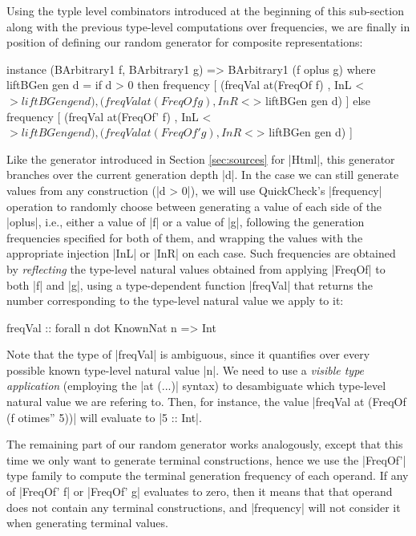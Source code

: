 Using the typle level combinators introduced at the beginning of this
sub-section along with the previous type-level computations over frequencies, we
are finally in position of defining our random generator for composite
representations:

\begin{code}
instance (BArbitrary1 f, BArbitrary1 g)
  => BArbitrary1 (f oplus g) where
  liftBGen gen d =
    if d > 0
    then frequency
      [ (freqVal  at(FreqOf f) ,  InL <$> liftBGen gen d)
      , (freqVal  at(FreqOf g) ,  InR <$> liftBGen gen d) ]
    else frequency
      [ (freqVal  at(FreqOf' f) ,  InL <$> liftBGen gen d)
      , (freqVal  at(FreqOf' g) ,  InR <$> liftBGen gen d) ]
\end{code}

Like the generator introduced in Section \ref{sec:sources} for |Html|, this
generator branches over the current generation depth |d|.
%
In the case we can still generate values from any construction (|d > 0|), we
will use QuickCheck's |frequency| operation to randomly choose between
generating a value of each side of the |oplus|, i.e., either a value of |f| or a
value of |g|, following the generation frequencies specified for both of them,
and wrapping the values with the appropriate injection |InL| or |InR| on each
case.
%
Such frequencies are obtained by \emph{reflecting} the type-level natural values
obtained from applying |FreqOf| to both |f| and |g|, using a type-dependent
function |freqVal| that returns the number corresponding to the type-level
natural value we apply to it:

\begin{code}
freqVal :: forall n dot KnownNat n => Int
\end{code}

Note that the type of |freqVal| is ambiguous, since it quantifies over every
possible known type-level natural value |n|.
%
We need to use a \emph{visible type application} (employing the |at (...)|
syntax) to desambiguate which type-level natural value we are refering to.
%
Then, for instance, the value |freqVal at (FreqOf (f otimes'' 5))| will evaluate
to |5 :: Int|.

The remaining part of our random generator works analogously, except that this
time we only want to generate terminal constructions, hence we use the |FreqOf'|
type family to compute the terminal generation frequency of each operand.
%
If any of |FreqOf' f| or |FreqOf' g| evaluates to zero, then it means that that
operand does not contain any terminal constructions, and |frequency| will not
consider it when generating terminal values.

